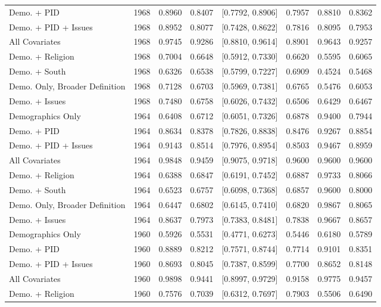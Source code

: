 \begin{longtable}{lrrrlrrr}
  Demo. + PID & 1968 & 0.8960 & 0.8407 & [0.7792, 0.8906] & 0.7957 & 0.8810 & 0.8362 \\ 
  Demo. + PID + Issues & 1968 & 0.8952 & 0.8077 & [0.7428, 0.8622] & 0.7816 & 0.8095 & 0.7953 \\ 
  All Covariates & 1968 & 0.9745 & 0.9286 & [0.8810, 0.9614] & 0.8901 & 0.9643 & 0.9257 \\ 
  Demo. + Religion & 1968 & 0.7004 & 0.6648 & [0.5912, 0.7330] & 0.6620 & 0.5595 & 0.6065 \\ 
  Demo. + South & 1968 & 0.6326 & 0.6538 & [0.5799, 0.7227] & 0.6909 & 0.4524 & 0.5468 \\ 
  Demo. Only, Broader Definition & 1968 & 0.7128 & 0.6703 & [0.5969, 0.7381] & 0.6765 & 0.5476 & 0.6053 \\ 
  Demo. + Issues & 1968 & 0.7480 & 0.6758 & [0.6026, 0.7432] & 0.6506 & 0.6429 & 0.6467 \\ 
  Demographics Only & 1964 & 0.6408 & 0.6712 & [0.6051, 0.7326] & 0.6878 & 0.9400 & 0.7944 \\ 
  Demo. + PID & 1964 & 0.8634 & 0.8378 & [0.7826, 0.8838] & 0.8476 & 0.9267 & 0.8854 \\ 
  Demo. + PID + Issues & 1964 & 0.9143 & 0.8514 & [0.7976, 0.8954] & 0.8503 & 0.9467 & 0.8959 \\ 
  All Covariates & 1964 & 0.9848 & 0.9459 & [0.9075, 0.9718] & 0.9600 & 0.9600 & 0.9600 \\ 
  Demo. + Religion & 1964 & 0.6388 & 0.6847 & [0.6191, 0.7452] & 0.6887 & 0.9733 & 0.8066 \\ 
  Demo. + South & 1964 & 0.6523 & 0.6757 & [0.6098, 0.7368] & 0.6857 & 0.9600 & 0.8000 \\ 
  Demo. Only, Broader Definition & 1964 & 0.6447 & 0.6802 & [0.6145, 0.7410] & 0.6820 & 0.9867 & 0.8065 \\ 
  Demo. + Issues & 1964 & 0.8637 & 0.7973 & [0.7383, 0.8481] & 0.7838 & 0.9667 & 0.8657 \\ 
  Demographics Only & 1960 & 0.5926 & 0.5531 & [0.4771, 0.6273] & 0.5446 & 0.6180 & 0.5789 \\ 
  Demo. + PID & 1960 & 0.8889 & 0.8212 & [0.7571, 0.8744] & 0.7714 & 0.9101 & 0.8351 \\ 
  Demo. + PID + Issues & 1960 & 0.8693 & 0.8045 & [0.7387, 0.8599] & 0.7700 & 0.8652 & 0.8148 \\ 
  All Covariates & 1960 & 0.9898 & 0.9441 & [0.8997, 0.9729] & 0.9158 & 0.9775 & 0.9457 \\ 
  Demo. + Religion & 1960 & 0.7576 & 0.7039 & [0.6312, 0.7697] & 0.7903 & 0.5506 & 0.6490 \\ 

\end{longtable}
